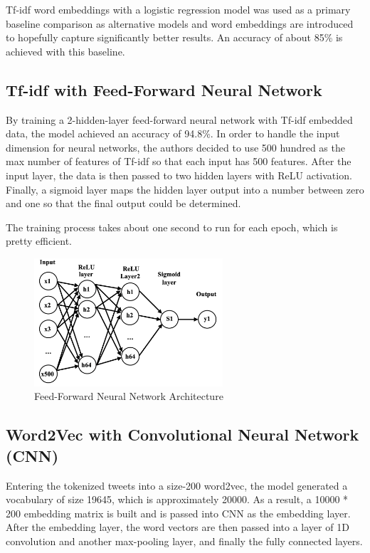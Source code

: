 \documentclass[conference]{IEEEtran}
\begin{document}
	Tf-idf word embeddings with a logistic regression model was used as a primary baseline comparison as alternative models and word embeddings are introduced to hopefully capture significantly better results.  An accuracy of about 85\% is achieved with this baseline.


\subsection{Tf-idf with Feed-Forward Neural Network}
By training a 2-hidden-layer feed-forward neural network with Tf-idf embedded data, the model achieved an accuracy of 94.8\%. In order to handle the input dimension for neural networks, the authors decided to use 500 hundred as the max number of features of Tf-idf so that each input has 500 features. After the input layer, the data is then passed to two hidden layers with ReLU activation. Finally, a sigmoid layer maps the hidden layer output into a number between zero and one so that the final output could be determined.

The training process takes about one second to run for each epoch, which is pretty efficient.

\begin{figure}[htbp]
\centerline{\includegraphics[width=70mm]{fig1.png}}
\caption{Feed-Forward Neural Network Architecture}
\label{fig}
\end{figure}

\subsection{Word2Vec with Convolutional Neural Network (CNN)}

Entering the tokenized tweets into a size-200 word2vec, the model generated a vocabulary of size 19645, which is approximately 20000. As a result, a 10000 * 200 embedding matrix is built and is passed into CNN as the embedding layer. After the embedding layer, the word vectors are then passed into a layer of 1D convolution and another max-pooling layer, and finally the fully connected layers.
\end{document}
